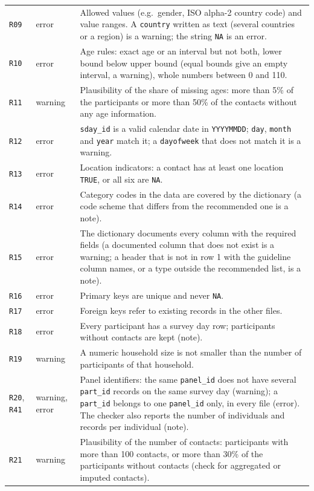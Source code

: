 \documentclass[11pt,a4paper]{article}
\begin{document}
{\begin{longtable}{p{1.1cm} p{1.7cm} p{11.9cm}}
\texttt{R09} & error & Allowed values (e.g.\ gender, ISO alpha-2 country code) and value ranges. A \texttt{country} written as text (several countries or a region) is a warning; the string \texttt{NA} is an error. \\
\texttt{R10} & error & Age rules: exact age or an interval but not both, lower bound below upper bound (equal bounds give an empty interval, a warning), whole numbers between 0 and 110. \\
\texttt{R11} & warning & Plausibility of the share of missing ages: more than 5\% of the participants or more than 50\% of the contacts without any age information. \\
\texttt{R12} & error & \texttt{sday\_id} is a valid calendar date in \texttt{YYYYMMDD}; \texttt{day}, \texttt{month} and \texttt{year} match it; a \texttt{dayofweek} that does not match it is a warning. \\
\texttt{R13} & error & Location indicators: a contact has at least one location \texttt{TRUE}, or all six are \texttt{NA}. \\
\texttt{R14} & error & Category codes in the data are covered by the dictionary (a code scheme that differs from the recommended one is a note). \\
\texttt{R15} & error & The dictionary documents every column with the required fields (a documented column that does not exist is a warning; a header that is not in row 1 with the guideline column names, or a type outside the recommended list, is a note). \\
\texttt{R16} & error & Primary keys are unique and never \texttt{NA}. \\
\texttt{R17} & error & Foreign keys refer to existing records in the other files. \\
\texttt{R18} & error & Every participant has a survey day row; participants without contacts are kept (note). \\
\texttt{R19} & warning & A numeric household size is not smaller than the number of participants of that household. \\
\texttt{R20}, \texttt{R41} & warning, error & Panel identifiers: the same \texttt{panel\_id} does not have several \texttt{part\_id} records on the same survey day (warning); a \texttt{part\_id} belongs to one \texttt{panel\_id} only, in every file (error). The checker also reports the number of individuals and records per individual (note). \\
\texttt{R21} & warning & Plausibility of the number of contacts: participants with more than 100 contacts, or more than 30\% of the participants without contacts (check for aggregated or imputed contacts). \\

\end{longtable}}
\end{document}

